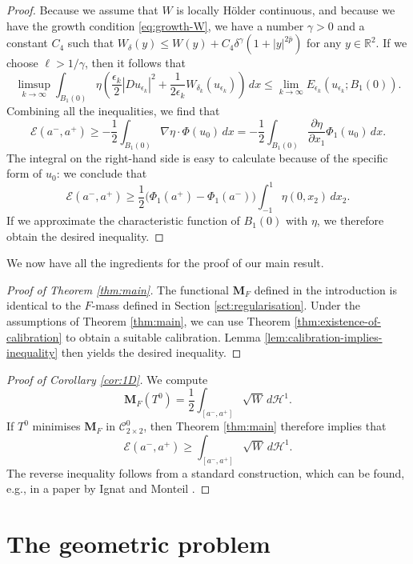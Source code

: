 \documentclass[a4paper]{article}
\newcommand{\R}{\mathbb{R}}
\newcommand{\Ha}{\mathcal{H}}
\newcommand{\M}{\mathbf{M}}
\newcommand{\ncrt}{\mathcal{C}}
\newcommand{\dd}[2]{\frac{\partial #1}{\partial #2}}
\theoremstyle{definition}
\theoremstyle{remark}
\begin{document}
\begin{proof}
Because we assume that $W$ is locally H\"older continuous, and because we have the
growth condition \eqref{eq:growth-W}, we have a number $\gamma > 0$ and a constant $C_4$ such that
$W_\delta(y) \le W(y) + C_4\delta^\gamma(1 + |y|^{2\bar{p}})$ for any $y \in \R^2$. If we choose $\ell > 1/\gamma$,
then it follows that
\[
\limsup_{k \to \infty} \int_{B_1(0)} \eta \left(\frac{\epsilon_k}{2} |Du_{\epsilon_k}|^2 + \frac{1}{2\epsilon_k}W_{\delta_k}(u_{\epsilon_k})\right) \, dx \le \lim_{k \to \infty} E_{\epsilon_k}(u_{\epsilon_k}; B_1(0)).
\]
Combining all the inequalities, we find that
\[
\mathcal{E}(a^-, a^+) \ge -\frac{1}{2} \int_{B_1(0)} \nabla \eta \cdot \Phi(u_0) \, dx = -\frac{1}{2} \int_{B_1(0)} \dd{\eta}{x_1} \Phi_1(u_0) \, dx.
\]
The integral on the right-hand side is easy to calculate because of the
specific form of $u_0$: we conclude that
\[
\mathcal{E}(a^-, a^+) \ge \frac{1}{2} \bigl(\Phi_1(a^+) - \Phi_1(a^-)\bigr) \int_{-1}^1 \eta(0, x_2) \, dx_2.
\]
If we approximate the characteristic function of $B_1(0)$ with $\eta$,
we therefore obtain the desired inequality.
\end{proof}

We now have all the ingredients for the proof of our main result.

\begin{proof}[Proof of Theorem \ref{thm:main}]
The functional $\M_F$ defined in the introduction is identical to the
$F$-mass defined in Section \ref{sct:regularisation}. Under the assumptions of
Theorem \ref{thm:main}, we can use Theorem \ref{thm:existence-of-calibration} to obtain
a suitable calibration. Lemma \ref{lem:calibration-implies-inequality} then yields the desired inequality.
\end{proof}

\begin{proof}[Proof of Corollary \ref{cor:1D}]
We compute
\[
\M_F(T^0) = \frac{1}{2} \int_{[a^-, a^+]} \sqrt{W} \, d\Ha^1.
\]
If $T^0$ minimises $\M_F$ in $\ncrt_{2 \times 2}^0$, then Theorem \ref{thm:main} therefore
implies that
\[
\mathcal{E}(a^-, a^+) \ge \int_{[a^-, a^+]} \sqrt{W} \, d\Ha^1.
\]
The reverse inequality follows from a standard construction, which can be found, e.g., in
a paper by Ignat and Monteil \cite[Proposition 4.1]{Ignat-Monteil:20}.
\end{proof}








\section{The geometric problem} \label{sct:geometric}
\end{document}
